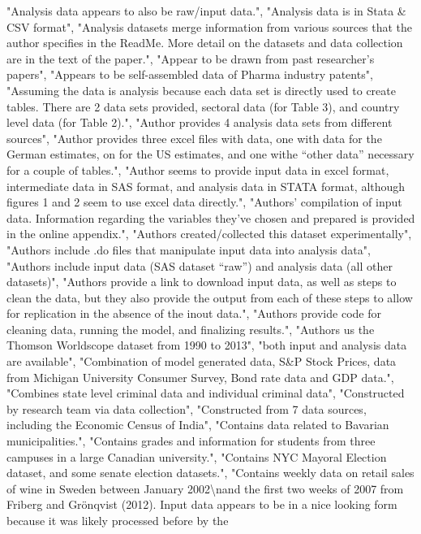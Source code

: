 \documentclass[]{article}
\begin{document}
\begin{itemize}
  "Analysis data appears to also be raw/input data.", "Analysis data is
  in Stata \& CSV format", "Analysis datasets merge information from
  various sources that the author specifies in the ReadMe. More detail
  on the datasets and data collection are in the text of the paper.",
  "Appear to be drawn from past researcher's papers", "Appears to be
  self-assembled data of Pharma industry patents", "Assuming the data is
  analysis because each data set is directly used to create tables.
  There are 2 data sets provided, sectoral data (for Table 3), and
  country level data (for Table 2).", "Author provides 4 analysis data
  sets from different sources", "Author provides three excel files with
  data, one with data for the German estimates, on for the US estimates,
  and one withe ``other data'' necessary for a couple of tables.",
  "Author seems to provide input data in excel format, intermediate data
  in SAS format, and analysis data in STATA format, although figures 1
  and 2 seem to use excel data directly.", "Authors' compilation of
  input data. Information regarding the variables they've chosen and
  prepared is provided in the online appendix.", "Authors
  created/collected this dataset experimentally", "Authors include .do
  files that manipulate input data into analysis data", "Authors include
  input data (SAS dataset ``raw'') and analysis data (all other
  datasets)", "Authors provide a link to download input data, as well as
  steps to clean the data, but they also provide the output from each of
  these steps to allow for replication in the absence of the inout
  data.", "Authors provide code for cleaning data, running the model,
  and finalizing results.", "Authors us the Thomson Worldscope dataset
  from 1990 to 2013", "both input and analysis data are available",
  "Combination of model generated data, S\&P Stock Prices, data from
  Michigan University Consumer Survey, Bond rate data and GDP data.",
  "Combines state level criminal data and individual criminal data",
  "Constructed by research team via data collection", "Constructed from
  7 data sources, including the Economic Census of India", "Contains
  data related to Bavarian municipalities.", "Contains grades and
  information for students from three campuses in a large Canadian
  university.", "Contains NYC Mayoral Election dataset, and some senate
  election datasets.", "Contains weekly data on retail sales of wine in
  Sweden between January 2002\textbackslash{}nand the first two weeks of
  2007 from Friberg and Grönqvist (2012). Input data appears to be in a
  nice looking form because it was likely processed before by the

\end{itemize}
\end{document}
